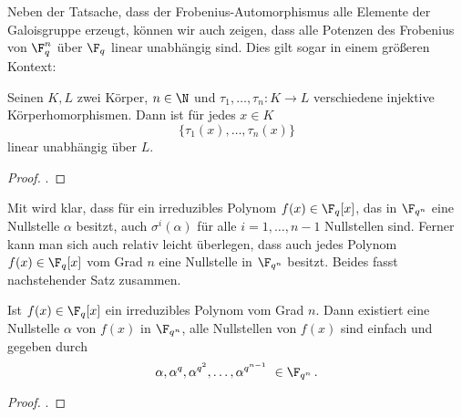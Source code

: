 Neben der Tatsache, dass der Frobenius-Automorphismus 
alle Elemente der Galoisgruppe erzeugt, können wir
auch zeigen, dass alle Potenzen des Frobenius von $\F_q^n$ über $\F_q$ linear
unabhängig sind. Dies gilt sogar in einem größeren Kontext:

\begin{satz}
  \label{satz:dedekindsches_lemma}
  Seinen $K,L$ zwei Körper, $n \in \N$ und $\tau_1,\ldots,\tau_n: K\to L$
  verschiedene injektive Körperhomorphismen. Dann ist für jedes $x \in K$
  \[ \{\tau_1(x),\ldots,\tau_n(x) \}\]
  linear unabhängig über $L$.
\end{satz}
\begin{proof}
  \autocite[Satz 27.2]{karpfinger2010algebra}.
\end{proof}


Mit  wird klar, dass für ein
irreduzibles Polynom $f(x) \in \F_q[x]$, das in $\F_{q^n}$ eine Nullstelle 
$\alpha$ besitzt, auch $\sigma^i(\alpha)$ für alle $i=1,\ldots,n-1$
Nullstellen sind. Ferner kann man sich auch relativ leicht überlegen, dass auch
jedes Polynom $f(x) \in \F_q[x]$ vom Grad $n$ eine Nullstelle in 
$\F_{q^n}$ besitzt. Beides fasst nachstehender Satz zusammen.

\begin{satz}
  \label{satz:nst_irred_polys}
  Ist $f(x) \in \F_q[x]$ ein irreduzibles Polynom vom Grad $n$. Dann 
  existiert eine Nullstelle $\alpha$ von $f(x)$ in $\F_{q^n}$, alle 
  Nullstellen von $f(x)$ sind einfach und gegeben durch
  \[ \alpha, \alpha^q, \alpha^{q^2}, \ldots, \alpha^{q^{n-1}}\ \in \F_{q^n}\,.\]
\end{satz}
\begin{proof}
  \autocite[Theorem 2.14]{lidl1997finite}.
\end{proof}

